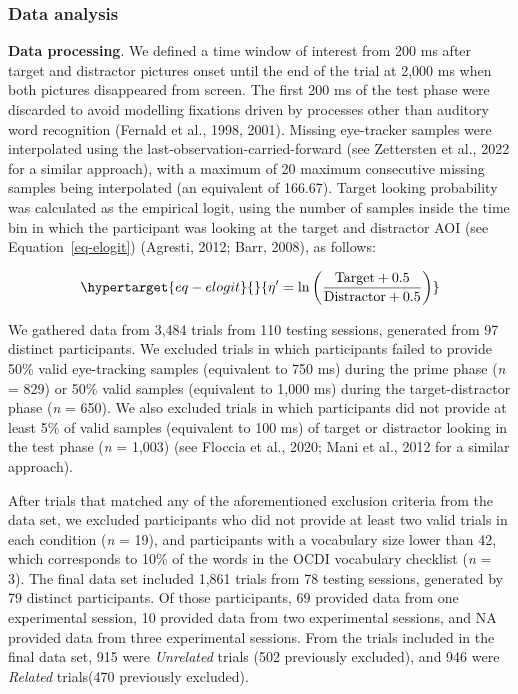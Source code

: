 \documentclass[
  12pt,
  b5paperpaper,
  twoside]{scrreprt}
\begin{document}
\hypertarget{data-analysis}{%
\subsubsection{Data analysis}\label{data-analysis}}

\textbf{Data processing}. We defined a time window of interest from 200
ms after target and distractor pictures onset until the end of the trial
at 2,000 ms when both pictures disappeared from screen. The first 200 ms
of the test phase were discarded to avoid modelling fixations driven by
processes other than auditory word recognition (Fernald et al., 1998,
2001). Missing eye-tracker samples were interpolated using the
last-observation-carried-forward (see Zettersten et al., 2022 for a
similar approach), with a maximum of 20 maximum consecutive missing
samples being interpolated (an equivalent of 166.67). Target looking
probability was calculated as the empirical logit, using the number of
samples inside the time bin in which the participant was looking at the
target and distractor AOI (see Equation~\ref{eq-elogit}) (Agresti, 2012;
Barr, 2008), as follows:

\begin{equation}\protect\hypertarget{eq-elogit}{}{
\eta' = \ln\bigg(\frac{\text{Target} + 0.5}{ \text{Distractor} + 0.5}\bigg)
}\label{eq-elogit}\end{equation}

We gathered data from 3,484 trials from 110 testing sessions, generated
from 97 distinct participants. We excluded trials in which participants
failed to provide 50\% valid eye-tracking samples (equivalent to 750 ms)
during the prime phase (\emph{n} = 829) or 50\% valid samples
(equivalent to 1,000 ms) during the target-distractor phase (\emph{n} =
650). We also excluded trials in which participants did not provide at
least 5\% of valid samples (equivalent to 100 ms) of target or
distractor looking in the test phase (\emph{n} = 1,003) (see Floccia et
al., 2020; Mani et al., 2012 for a similar approach).

After trials that matched any of the aforementioned exclusion criteria
from the data set, we excluded participants who did not provide at least
two valid trials in each condition (\emph{n} = 19), and participants
with a vocabulary size lower than 42, which corresponds to 10\% of the
words in the OCDI vocabulary checklist (\emph{n} = 3). The final data
set included 1,861 trials from 78 testing sessions, generated by 79
distinct participants. Of those participants, 69 provided data from one
experimental session, 10 provided data from two experimental sessions,
and NA provided data from three experimental sessions. From the trials
included in the final data set, 915 were \emph{Unrelated} trials (502
previously excluded), and 946 were \emph{Related} trials(470 previously
excluded).
\end{document}
